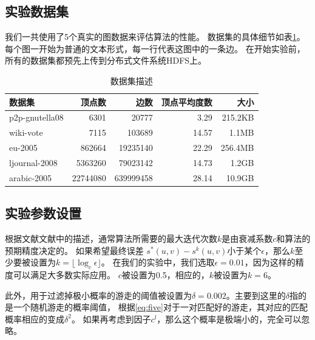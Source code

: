 \documentclass[master]{njuthesis}
\begin{document}
\subsection{实验数据集}
我们一共使用了5个真实的图数据来评估算法的性能。 数据集的具体细节如表\ref{tab:dataset1}。
每个图一开始为普通的文本形式，每一行代表这图中的一条边。
在开始实验前，所有的数据集都预先上传到分布式文件系统HDFS上。
\begin{table}[h]
\caption{数据集描述}
\label{tab:dataset1}
\centering
\begin{tabular}{|l|r|r|r|r|}
\hline
\textbf{数据集} & \textbf{顶点数} & \textbf{边数} & \textbf{顶点平均度数} & \textbf{大小} \\
\hline
p2p-gnutella08 \footnotemark[1]  & {6301}         & \num{20777}                   & 3.29                & 215.2KB\\
\hline
wiki-vote \footnotemark[2]    & 7115 	& \num{103689}                           &14.57                & 1.1MB  \\
\hline
eu-2005       \footnotemark[3]     & \num{862664}  & \num{19235140 }          & 22.29             & 256.4MB\\
\hline
ljournal-2008  \footnotemark[4] & \num{5363260} & \num{79023142}         & 14.73            &1.2GB\\
\hline
arabic-2005 \footnotemark[5]   & \num{22744080} & \num{639999458}      & 28.14           & 10.9GB\\
\hline
\end{tabular}
\end{table}
\subsection{实验参数设置}
根据文献文献\cite{lizorkin2008accuracy}中的描述，通常算法所需要的最大迭代次数$k$是由衰减系数$c$和算法的预期精度决定的。 
如果希望最终误差 $s^*(u,v) - s^k(u,v)$小于某个$\epsilon$，那么$k$至少要被设置为$k=\lfloor \log_c \epsilon \rfloor$。
在我们的实验中，我们选取$\epsilon=0.01$，因为这样的精度可以满足大多数实际应用。 
$c$被设置为0.5，相应的，$k$被设置为$k=6$。

此外，用于过滤掉极小概率的游走的阈值被设置为$\delta=0.002$。主要到这里的$\delta$指的是一个随机游走的概率阈值，
根据\ref{eq:five}对于一对匹配好的游走，其对应的匹配概率相应的变成${\delta}^2$。
如果再考虑到因子$c^l$，那么这个概率是极端小的，完全可以忽略。
\end{document}
